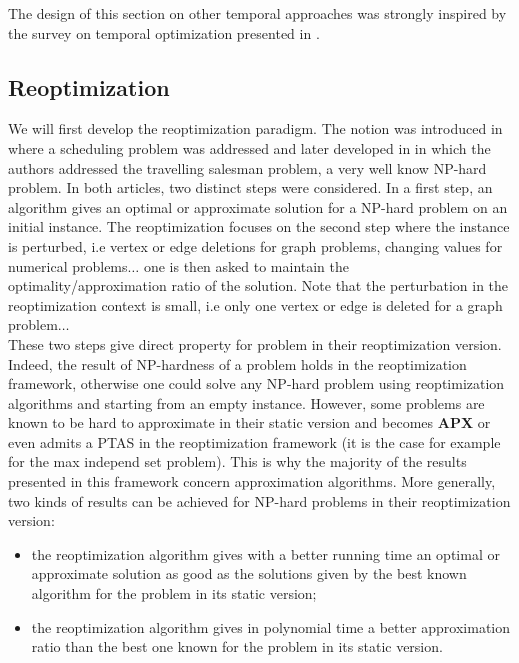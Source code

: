 \documentclass[a4paper]{book}
\begin{document}
The design of this section on other temporal approaches was strongly inspired by the survey on temporal optimization presented in \cite{boria2011survey}. 

\subsection{Reoptimization}
We will first develop the reoptimization paradigm.  The notion was introduced in \cite{Schaffter97} where a scheduling problem was addressed and later developed in \cite{archetti2003reoptimizing} in which the authors addressed the {\sc travelling salesman} problem, a very well know NP-hard problem. In both articles, two distinct steps were considered. In a first step, an algorithm gives an optimal or approximate solution for a NP-hard problem on an initial instance. The reoptimization focuses on the second step where the instance is perturbed, i.e vertex or edge deletions for graph problems, changing values for numerical problems$\ldots$ one is then asked to maintain the optimality/approximation ratio of the solution. Note that the perturbation in the reoptimization context is small, i.e only one vertex or edge is deleted for a graph problem$\ldots$ \\
These two steps give direct property for problem in their reoptimization version. Indeed, the result of NP-hardness of a problem holds in the reoptimization framework, otherwise one could solve any NP-hard problem using reoptimization algorithms and starting from an empty instance. However, some problems are known to be hard to approximate in their static version and becomes \textbf{APX} or even admits a PTAS in the reoptimization framework (it is the case for example for the {\sc max independ set} problem). This is why the majority of the results presented in this framework concern approximation algorithms. More generally, two kinds of results can be achieved for NP-hard problems in their reoptimization version:
\begin{itemize}
    \item the reoptimization algorithm gives with a better running time an optimal or approximate solution as good as the solutions given by the best known algorithm for the problem in its static version; 
    \item the reoptimization algorithm gives in polynomial time a better approximation ratio than the best one known for the problem in its static version.
\end{itemize}
\end{document}
